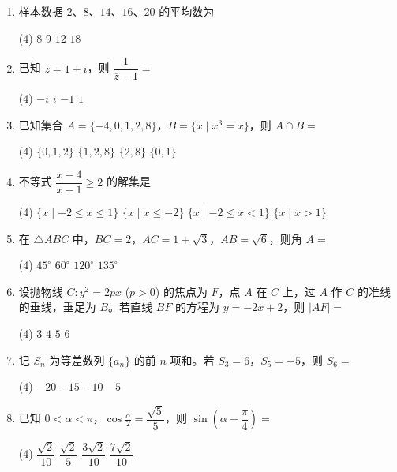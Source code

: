 \documentclass[UTF8]{ctexart}
\begin{document}
	
	\begin{enumerate}[leftmargin=*, label=\textbf{\arabic*.}]
		\item 样本数据 $2$、$8$、$14$、$16$、$20$ 的平均数为
		\begin{tasks}(4)
			\task $8$
			\task $9$
			\task $12$
			\task $18$
		\end{tasks}
		
		\item 已知 $z = 1 + i$，则 $\dfrac{1}{\overline{z}-1} =$
		\begin{tasks}(4)
			\task $-i$
			\task $i$
			\task $-1$
			\task $1$
		\end{tasks}
		
		\item 已知集合 $A = \{-4, 0, 1, 2, 8\}$，$B = \{x \mid x^{3}=x\}$，则 $A \cap B =$
		\begin{tasks}(4)
			\task $\{0, 1, 2\}$
			\task $\{1, 2, 8\}$
			\task $\{2, 8\}$
			\task $\{0, 1\}$
		\end{tasks}
		
		\item 不等式 $\dfrac{x - 4}{x - 1} \geq 2$ 的解集是
		\begin{tasks}(4)
			\task $\{x \mid -2 \leq x \leq 1\}$
			\task $\{x \mid x \leq -2\}$
			\task $\{x \mid -2 \leq x < 1\}$
			\task $\{x \mid x > 1\}$
		\end{tasks}
		
		\item 在 $\triangle ABC$ 中，$BC = 2$，$AC = 1+\sqrt{3}$，$AB=\sqrt{6}$，则角 $A =$
		\begin{tasks}(4)
			\task $45^{\circ}$
			\task $60^{\circ}$
			\task $120^{\circ}$
			\task $135^{\circ}$
		\end{tasks}
		
		\item 设抛物线 $C: y^{2}=2px$ ($p>0$) 的焦点为 $F$，点 $A$ 在 $C$ 上，过 $A$ 作 $C$ 的准线的垂线，垂足为 $B$。若直线 $BF$ 的方程为 $y = -2x + 2$，则 $|AF| =$
		\begin{tasks}(4)
			\task $3$
			\task $4$
			\task $5$
			\task $6$
		\end{tasks}
		
		\item 记 $S_n$ 为等差数列 $\{a_n\}$ 的前 $n$ 项和。若 $S_3 = 6$，$S_5 = -5$，则 $S_6 =$
		\begin{tasks}(4)
			\task $-20$
			\task $-15$
			\task $-10$
			\task $-5$
		\end{tasks}
		
		\item 已知 $0 < \alpha < \pi$，$\cos\frac{\alpha}{2} = \dfrac{\sqrt{5}}{5}$，则 $\sin\left(\alpha - \dfrac{\pi}{4}\right) =$
		\begin{tasks}(4)
			\task $\dfrac{\sqrt{2}}{10}$
			\task $\dfrac{\sqrt{2}}{5}$
			\task $\dfrac{3\sqrt{2}}{10}$
			\task $\dfrac{7\sqrt{2}}{10}$
		\end{tasks}


\end{enumerate}
\end{document}
